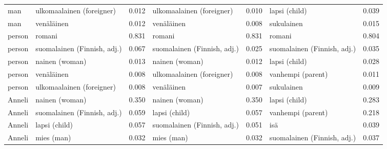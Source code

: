 \begin{longtable}{llrlrlr}
   man &   ulkomaalainen (foreigner) &                            0.012 &   ulkomaalainen (foreigner) &                                 0.010 &               lapsi (child) &                           0.039 \\
   man &                  venäläinen &                            0.012 &                  venäläinen &                                 0.008 &                  sukulainen &                           0.015 \\
person &                      romani &                            0.831 &                      romani &                                 0.831 &                      romani &                           0.804 \\
person & suomalainen (Finnish, adj.) &                            0.067 & suomalainen (Finnish, adj.) &                                 0.025 & suomalainen (Finnish, adj.) &                           0.035 \\
person &              nainen (woman) &                            0.013 &              nainen (woman) &                                 0.012 &               lapsi (child) &                           0.028 \\
person &                  venäläinen &                            0.008 &   ulkomaalainen (foreigner) &                                 0.008 &           vanhempi (parent) &                           0.011 \\
person &   ulkomaalainen (foreigner) &                            0.008 &                  venäläinen &                                 0.007 &                  sukulainen &                           0.009 \\
Anneli &              nainen (woman) &                            0.350 &              nainen (woman) &                                 0.350 &               lapsi (child) &                           0.283 \\
Anneli & suomalainen (Finnish, adj.) &                            0.059 &               lapsi (child) &                                 0.057 &           vanhempi (parent) &                           0.218 \\
Anneli &               lapsi (child) &                            0.057 & suomalainen (Finnish, adj.) &                                 0.051 &                         isä &                           0.039 \\
Anneli &                  mies (man) &                            0.032 &                  mies (man) &                                 0.032 & suomalainen (Finnish, adj.) &                           0.037 \\

\end{longtable}
